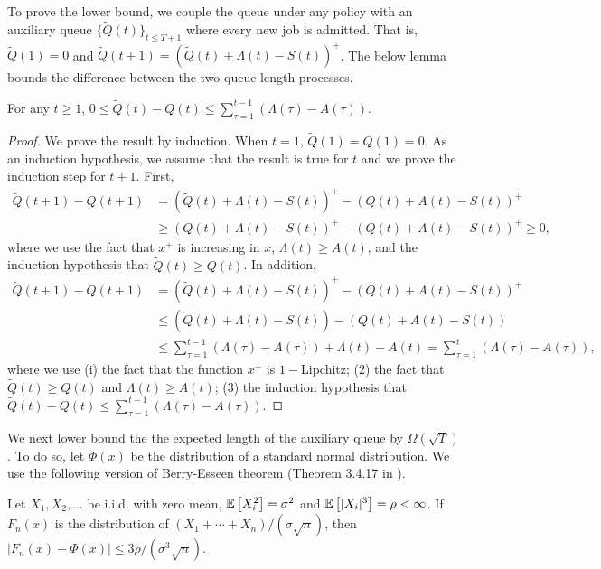 To prove the lower bound, we couple the queue under any policy with an auxiliary queue $\{\tilde{Q}(t)\}_{t \leq T+1}$ where every new job is admitted. That is, $\tilde{Q}(1) = 0$ and $\tilde{Q}(t+1) = (\tilde{Q}(t) + \Lambda(t) - S(t))^+$. The below lemma bounds the difference between the two queue length processes.
\begin{lemma}\label{lem:coupling}
For any $t \geq 1$, $0 \leq \tilde{Q}(t) - Q(t) \leq \sum_{\tau=1}^{t - 1} (\Lambda(\tau) - A(\tau)).$
\end{lemma}
\begin{proof}
We prove the result by induction. When $t =1 $, $\tilde{Q}(1) = Q(1) = 0$. As an induction hypothesis, we assume that  the result is true for $t$ and we prove the induction step for $t + 1$. First,
\begin{align*}
\tilde{Q}(t+1) - Q(t+1) &= (\tilde{Q}(t) + \Lambda(t) - S(t))^+ - (Q(t) + A(t) - S(t))^+  \\
&\geq (Q(t) + \Lambda(t) - S(t))^+ - (Q(t)+A(t) - S(t))^+ \geq 0,
\end{align*}
where we use the fact that $x^+$ is increasing in $x$, $\Lambda(t) \geq A(t)$, and the induction hypothesis that $\tilde{Q}(t) \geq Q(t)$. In addition,
\begin{align*}
\tilde{Q}(t+1) - Q(t+1) &= (\tilde{Q}(t) + \Lambda(t) - S(t))^+ - (Q(t) + A(t) - S(t))^+  \\ 
&\leq \left(\tilde{Q}(t) + \Lambda(t) - S(t)\right) - \left(Q(t) + A(t) - S(t)\right)  \\
&\leq \sum_{\tau=1}^{t-1} (\Lambda(\tau) - A(\tau)) + \Lambda(t) - A(t) = \sum_{\tau=1}^t (\Lambda(\tau) - A(\tau)),
\end{align*}
where we use (i) the fact that the function $x^+$ is $1-$Lipchitz; (2) the fact that $\tilde{Q}(t) \geq Q(t)$ and $\Lambda(t) \geq A(t)$; (3) the induction hypothesis that $\tilde{Q}(t) - Q(t) \leq \sum_{\tau=1}^{t-1} (\Lambda(\tau) - A(\tau)).$
\end{proof} We next lower bound the  the expected length of the auxiliary queue by $\Omega(\sqrt{T})$. To do so, let $\Phi(x)$ be the distribution of a standard normal distribution. We use the following version of Berry-Esseen theorem (Theorem 3.4.17 in \cite{durrett2019probability}).
\begin{fact}\label{fact:berry}
Let $X_1,X_2,\ldots$ be i.i.d. with zero mean, $\mathbb E\left[X_i^2\right] = \sigma^2$ and $\mathbb E\left[|X_i|^3\right] = \rho < \infty$. If $F_n(x)$ is the distribution of $(X_1+\cdots+X_n) / (\sigma\sqrt{n})$, then $|F_n(x) - \Phi(x)| \leq 3\rho / (\sigma^3 \sqrt{n}).$
\end{fact}
